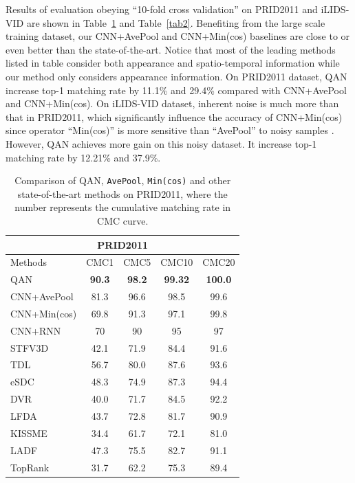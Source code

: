Results of evaluation obeying ``10-fold cross validation'' on  PRID2011 and iLIDS-VID are shown in Table~\ref{tab1} and Table~\ref{tab2}. Benefiting from the large scale training dataset, our CNN+AvePool and CNN+Min(cos) baselines are close to or even better than the state-of-the-art. Notice that most of the leading methods listed in table consider both appearance and spatio-temporal information while our method only considers appearance information. On PRID2011 dataset, QAN increase  top-1 matching rate by 11.1\% and 29.4\% compared with CNN+AvePool and CNN+Min(cos). On iLIDS-VID dataset, inherent noise is much more than that in PRID2011, which significantly influence the accuracy of CNN+Min(cos) since operator ``Min(cos)'' is more sensitive than ``AvePool'' to noisy samples . However, QAN achieves more gain on this noisy dataset. It increase top-1 matching rate by 12.21\% and 37.9\%. 

\begin{table}[!htb]
\normalsize
  \centering
  \begin{tabular}{l|c|c|c|c}
\hline
      \multicolumn{5}{c}{PRID2011}\\
\hline
       Methods & CMC1 &CMC5&CMC10 & CMC20 \\
\hline
       QAN 	& \textbf{90.3} & \textbf{98.2} & \textbf{99.32} & \textbf{100.0}  \\
       CNN+AvePool 		& 81.3 & 96.6 & 98.5 & 99.6 \\
       CNN+Min(cos) 		& 69.8 & 91.3 & 97.1 & 99.8  \\
\hline
       CNN+RNN\cite{wu2016deep} & 70 & 90 & 95 & 97  \\
       STFV3D\cite{liu2015spatio} & 42.1 & 71.9 & 84.4 & 91.6 \\
       TDL\cite{you2016top} 				& 56.7 & 80.0 & 87.6 & 93.6 \\
       eSDC\cite{wang2016person} 	& 48.3 & 74.9 & 87.3 & 94.4  \\
       DVR\cite{wang2016person} 	& 40.0 & 71.7 & 84.5 & 92.2 \\
       LFDA\cite{pedagadi2013local}	& 43.7 & 72.8 & 81.7 & 90.9  \\
       KISSME\cite{koestinger2012large}	& 34.4 & 61.7 & 72.1 & 81.0  \\
       LADF\cite{li2013learning} 				& 47.3 & 75.5 & 82.7 & 91.1 \\
       TopRank\cite{li2014top} 			& 31.7 & 62.2 & 75.3 & 89.4  \\
\hline
  \end{tabular}
  \caption{Comparison of QAN, \texttt{AvePool}, \texttt{Min(cos)} and other state-of-the-art methods on PRID2011, where the number represents the cumulative matching rate in CMC curve.}
  \label{tab1}
\end{table}

